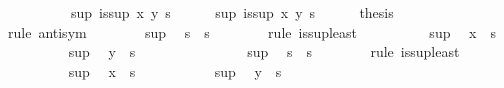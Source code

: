 \begin{isabellebody}
%
\isadelimproof
\ \ %
\endisadelimproof
%
\isatagproof
{}\isamarkupfalse%
\ {\isacharminus}\isanewline
\ \ \ \ \isamarkupfalse%
\ sup{\isacharcolon}\ {\isachardoublequoteopen}is{\isacharunderscore}sup\ x\ y\ s{\isachardoublequoteclose}\isanewline
\ \ \ \ \isamarkupfalse%
\ sup{\isacharprime}{\isacharcolon}\ {\isachardoublequoteopen}is{\isacharunderscore}sup\ x\ y\ s{\isacharprime}{\isachardoublequoteclose}\isanewline
\ \ \ \ \isamarkupfalse%
\ {\isacharquery}thesis\isanewline
\ \ \ \ \isamarkupfalse%
\ {\isacharparenleft}rule\ anti{\isacharunderscore}sym{\isacharparenright}\isanewline
\ \ \ \ \ \ \isamarkupfalse%
\ sup\ \isamarkupfalse%
\ {\isachardoublequoteopen}s\ {\isasymsqsubseteq}\ s{\isacharprime}{\isachardoublequoteclose}\isanewline
\ \ \ \ \ \ \isamarkupfalse%
\ {\isacharparenleft}rule\ is{\isacharunderscore}sup{\isacharunderscore}least{\isacharparenright}\isanewline
\ \ \ \ \ \ \ \ \isamarkupfalse%
\ sup{\isacharprime}\ \isamarkupfalse%
\ {\isachardoublequoteopen}x\ {\isasymsqsubseteq}\ s{\isacharprime}{\isachardoublequoteclose}\ \isacommand{{\isachardot}{\isachardot}}\isamarkupfalse%
\isanewline
\ \ \ \ \ \ \ \ \isamarkupfalse%
\ sup{\isacharprime}\ \isamarkupfalse%
\ {\isachardoublequoteopen}y\ {\isasymsqsubseteq}\ s{\isacharprime}{\isachardoublequoteclose}\ \isacommand{{\isachardot}{\isachardot}}\isamarkupfalse%
\isanewline
\ \ \ \ \ \ \isamarkupfalse%
\isanewline
\ \ \ \ \ \ \isamarkupfalse%
\ sup{\isacharprime}\ \isamarkupfalse%
\ {\isachardoublequoteopen}s{\isacharprime}\ {\isasymsqsubseteq}\ s{\isachardoublequoteclose}\isanewline
\ \ \ \ \ \ \isamarkupfalse%
\ {\isacharparenleft}rule\ is{\isacharunderscore}sup{\isacharunderscore}least{\isacharparenright}\isanewline
\ \ \ \ \ \ \ \ \isamarkupfalse%
\ sup\ \isamarkupfalse%
\ {\isachardoublequoteopen}x\ {\isasymsqsubseteq}\ s{\isachardoublequoteclose}\ \isacommand{{\isachardot}{\isachardot}}\isamarkupfalse%
\isanewline
\ \ \ \ \ \ \ \ \isamarkupfalse%
\ sup\ \isamarkupfalse%
\ {\isachardoublequoteopen}y\ {\isasymsqsubseteq}\ s{\isachardoublequoteclose}\ \isacommand{{\isachardot}{\isachardot}}\isamarkupfalse%
\isanewline
\ \ \ \ \ \ \isamarkupfalse%
\isanewline
\ \ \ \ \isamarkupfalse%
\isanewline
\ \ \isamarkupfalse%

\end{isabellebody}
